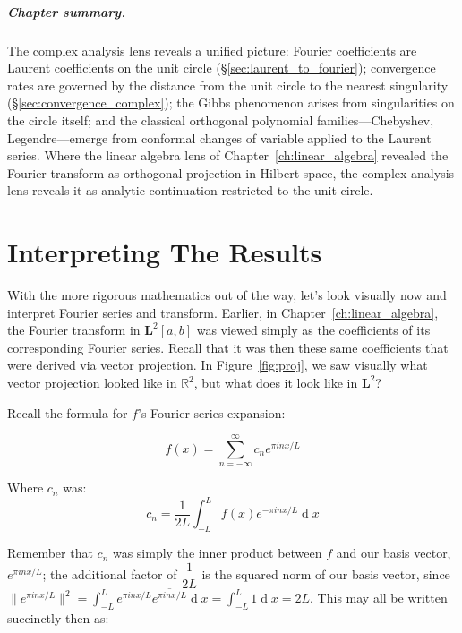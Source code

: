 \documentclass[12pt,a4paper]{report}
\DeclareMathOperator{\deriv}{d}
\theoremstyle{thms}
\theoremstyle{defns}
\begin{document}
\paragraph{Chapter summary.} The complex analysis lens reveals a unified picture: Fourier coefficients are Laurent coefficients on the unit circle (\S\ref{sec:laurent_to_fourier}); convergence rates are governed by the distance from the unit circle to the nearest singularity (\S\ref{sec:convergence_complex}); the Gibbs phenomenon arises from singularities on the circle itself; and the classical orthogonal polynomial families—Chebyshev, Legendre—emerge from conformal changes of variable applied to the Laurent series. Where the linear algebra lens of Chapter~\ref{ch:linear_algebra} revealed the Fourier transform as orthogonal projection in Hilbert space, the complex analysis lens reveals it as analytic continuation restricted to the unit circle.

\chapter{Interpreting The Results}
\label{ch:interpreting}
With the more rigorous mathematics out of the way, let's look visually now and interpret Fourier series and transform. Earlier, in Chapter~\ref{ch:linear_algebra}, the Fourier transform in $\mathbf{L}^2[a, b]$ was viewed simply as the coefficients of its corresponding Fourier series. Recall that it was then these same coefficients that were derived via vector projection. In Figure~\ref{fig:proj}, we saw visually what vector projection looked like in $\mathbb{R}^2$, but what does it look like in $\mathbf{L}^2$?

Recall the formula for $f$'s Fourier series expansion:

\begin{equation}
    f(x) = \sum_{n=-\infty}^{\infty} c_ne^{\pi inx/L}
\end{equation}

Where $c_n$ was:
\begin{equation}
    c_n = \dfrac{1}{2L}\int_{-L}^{L} f(x)e^{-\pi inx/L}\deriv{x}
\end{equation}

Remember that $c_n$ was simply the inner product between $f$ and our basis vector, $e^{\pi inx/L}$; the additional factor of $\dfrac{1}{2L}$ is the squared norm of our basis vector, since $\|e^{\pi inx/L}\|^2 = \int_{-L}^{L} e^{\pi inx/L}\overline{e^{\pi inx/L}}\deriv{x} = \int_{-L}^{L} 1\deriv{x} = 2L$. This may all be written succinctly then as:
\end{document}
